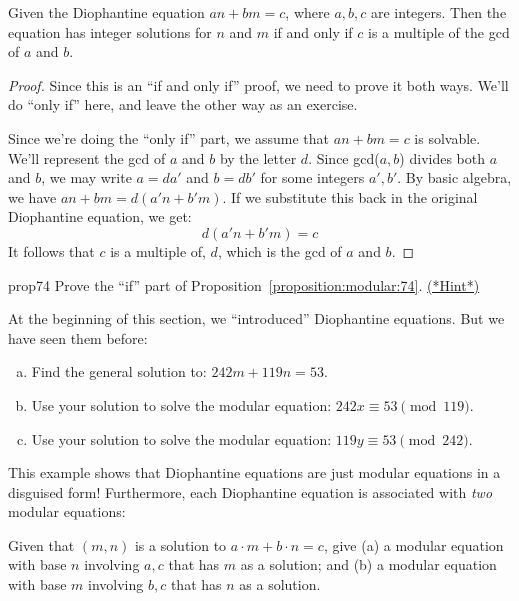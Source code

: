 \begin{prop}{74}
Given the Diophantine equation $an + bm = c$, where $a,b,c$ are integers. Then the equation  has integer solutions for $n$ and $m$  if and only if $c$ is a multiple of the gcd of $a$ and $b$.
\end{prop}
\begin{proof}{}
Since this is an ``if and only if'' proof, we need to prove it both ways.  We'll do ``only if''  here, and leave the other way as an exercise.

Since we're doing the ``only if'' part, we assume that $an + bm = c$ is solvable.
We'll represent the gcd of $a$ and $b$ by the letter $d$. Since gcd($a,b$) divides both $a$ and $b$, we may write $a = da'$ and $b = db'$ for some integers $a',b'$.  By basic algebra, we have $an+bm =d(a'n +b'm)$. If we substitute this back in the original Diophantine equation, we get:
\[d(a'n +b'm)=c\]
It follows that $c$ is a multiple of, $d$, which is the gcd of $a$ and $b$.
\end{proof}

\begin {exercise}{prop74}
Prove the ``if'' part of Proposition~\ref{proposition:modular:74}. 
\hyperref[sec:modular_arithmetic:hints]{(*Hint*)}
\end{exercise}


At the beginning of this section, we ``introduced'' Diophantine equations.  But we have seen them before:

\begin{exercise}{}
\begin{enumerate}[(a)]
\item
Find the general solution to: $242m + 119n = 53$.
\item 
Use your solution to solve the modular equation: $242x \equiv 53 \pmod{119}$.
\item
Use your solution to solve the modular equation:  $119y \equiv 53 \pmod{242}$.
\end{enumerate}
\end{exercise}
This example shows that Diophantine equations are just modular equations in a disguised form!  Furthermore, each Diophantine equation is associated with \emph{two} modular equations:

\begin{exercise}{}
Given that $(m,n)$ is a solution to $a \cdot m + b \cdot n  = c$, give (a) a modular equation with base $n$  involving $a,c$ that has $m$ as a solution; and (b) a modular equation with base $m$ involving $b,c$ that has $n$ as a solution.
\end{exercise}


